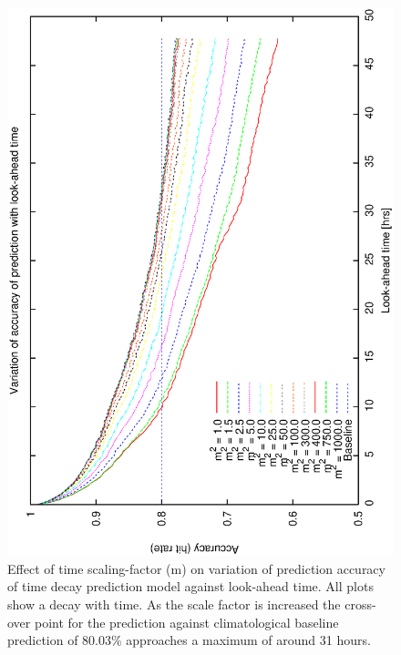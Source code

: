 {{\begin{figure}[htbp] 
  \begin{center}
    \includegraphics[scale=0.4, angle=-90]{figures/ecs/gbc_predict.eps}
  \end{center}
  \caption[Accuracy of look-ahead weather prediction using time decay model against look-ahead time]
  {Effect of time scaling-factor (m) on variation of prediction accuracy of time decay prediction model against look-ahead time. All plots show a decay with time. As the scale factor is increased the cross-over point for the prediction against climatological baseline prediction of 80.03\% approaches a maximum of around 31 hours. }
  \label{fig:gbc_prediction}
\end{figure}

}}
